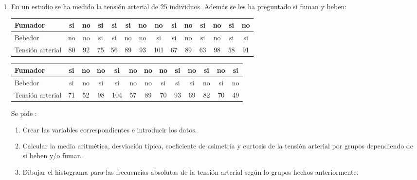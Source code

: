 \begin{enumerate}[leftmargin=*]
\item En un estudio se ha medido la tensión arterial de 25 individuos. Además se les ha preguntado si fuman y beben:
\begin{center}
\begin{tabular}{l|ccccccccccccc}
Fumador  & si & no & si & si & si & no & no & si & no & si & no & si & no \\
\hline
Bebedor & no & no & si & si & no & no & si & si & no & si & no & si & si \\
\hline
Tensión arterial & 80 & 92 & 75 & 56 & 89 & 93 & 101 & 67 & 89 & 63 & 98 & 58 & 91 \\
\end{tabular}

\begin{tabular}{l|cccccccccccc}
Fumador  & si & no & no & si & no & no & no & si & no & si & no & si \\
\hline
Bebedor & si & no & si & si & no & no & si & si & si & no & si & no \\
\hline
Tensión arterial & 71 & 52 & 98 & 104 & 57 & 89 & 70 & 93 & 69 & 82 & 70 & 49 \\
\end{tabular}
\end{center}

Se pide :
\begin{enumerate}
\item Crear las variables correspondientes e introducir los datos.

\item Calcular la media aritmética, desviación típica, coeficiente
de asimetría y curtosis de la tensión arterial por grupos
dependiendo de si beben y/o fuman.

\item Dibujar el histograma para las frecuencias absolutas de la
tensión arterial según lo grupos hechos anteriormente.
\end{enumerate}

\end{enumerate}
